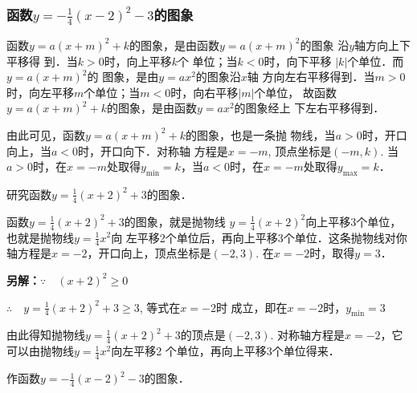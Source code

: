 \subsubsection{函数$y=-\frac{1}{4}(x-2)^2-3$的图象}

函数$y=a(x+m)^2+k$的图象，是由函数$y=a(x+m)^2$的图象
沿$y$轴方向上下平移得
到．当$k>0$时，向上平移$k$个
单位；当$k<0$时，向下平移
$|k|$个单位．而$y=a(x+m)^2$的
图象，是由$y=ax^2$的图象沿$x$轴
方向左右平移得到．当$m>0$
时，向左平移$m$个单位；当$m<0$时，向右平移$|m|$个单位，
故函数$y=a(x+m)^2+k$的图象，是由函数$y=ax^2$的图象经上
下左右平移得到．

由此可见，函数$y=a(x+m)^2+k$的图象，也是一条抛
物线，当$a>0$时，开口向上，当$a<0$时，开口向下．对称轴
方程是$x=-m$, 顶点坐标是$(-m,k)$. 当$a>0$时，在$x=
-m$处取得$y_{\min}=k$，当$a<0$时，在$x=-m$处取得$y_{\max}=k$．

\begin{example}
    研究函数$y=\frac{1}{4}(x+2)^2+3$的图象．
\end{example}

\begin{solution}
函数$y=\frac{1}{4}(x+2)^2+3$的图象，就是抛物线
$y=\frac{1}{4}(x+2)^2$向上平移3个单位，也就是抛物线$y=\frac{1}{4}x^2$向
左平移2个单位后，再向上平移3个单位．这条抛物线对你
轴方程是$x=-2$，开口向上，顶点坐标是$(-2,3)$. 在$x=-2$时，取得$y=3$．

\textbf{另解：}$\because\quad (x+2)^2\ge 0$

$\therefore\quad y=\frac{1}{4}(x+2)^2+3\ge 3$, 等式在$x=-2$时
成立，即在$x=-2$时，$y_{\min}=3$

由此得知抛物线$y=\frac{1}{4}(x+2)^2+3$的顶点是$(-2,3)$. 
对称轴方程是$x=-2$，它可以由抛物线$y=\frac{1}{4}x^2$向左平移2
个单位，再向上平移3个单位得来．
\end{solution}


\begin{example}
    作函数$y=-\frac{1}{4}(x-2)^2-3$的图象．
\end{example}

